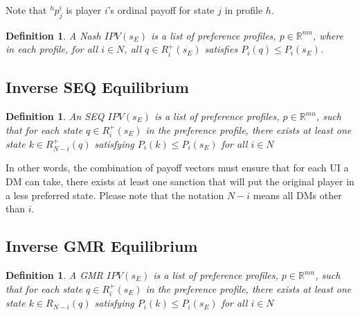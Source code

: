 \documentclass[letterpaper,12pt,titlepage,oneside,final]{book}
\newtheorem{definition}[lemma]{Definition}
\begin{document}
\noindent Note that $^hp_j^i$ is player $i$'s ordinal payoff for state $j$ in profile $h$.

\begin{definition}
\rm
A \emph{Nash $IPV(s_E)$} is a list of preference profiles, $p \in \mathbb{R}^{mn}$, where in each profile, for all $i \in N$, all $q \in R^{+}_{i}(s_E)$ satisfies $P_i(q)\leq P_i(s_E)$.
\end{definition}

\subsection{Inverse SEQ Equilibrium}

\begin{definition}
\rm
\label{def:seq_inv}
An \emph{SEQ $IPV(s_E)$} is a list of preference profiles, $p \in \mathbb{R}^{mn}$, such that for each state $q \in R^{+}_{i}(s_E)$ in the preference profile, there exists at least one state $k\in R^{+}_{N-i}(q)$ satisfying $P_i(k)\leq P_i(s_E)$ for all %
$i \in N$ 
\end{definition}

In other words, the combination of payoff vectors must ensure that for each UI a DM can take, there exists at least one sanction that will put the original player in a less preferred state. Please note that the notation $N-i$ means all DMs other than $i$.



\subsection{Inverse GMR Equilibrium}

\begin{definition}
\label{def:gmr_inv}
\rm
A \emph{GMR $IPV(s_E)$} is a list of preference profiles, $p \in \mathbb{R}^{mn}$, such that for each state $q \in R^{+}_{i}(s_E)$ in the preference profile, there exists at least one state $k\in R_{N-i}(q)$ satisfying $P_i(k)\leq P_i(s_E)$ for all %
$i \in N$ 
\end{definition}

\end{document}
